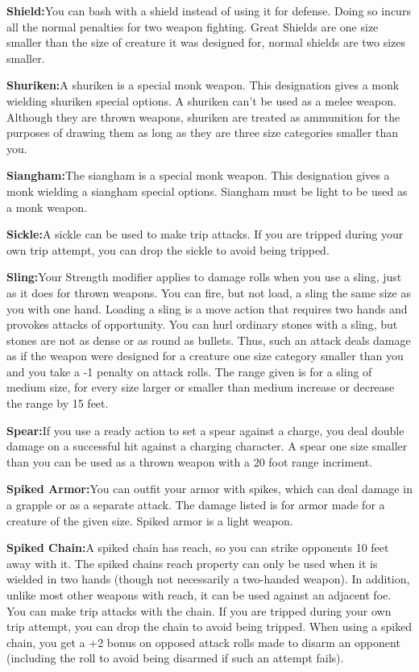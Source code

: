 \textbf{Shield:}{You can bash with a shield instead of using it for defense. Doing so incurs all the normal penalties for two weapon fighting. Great Shields are one size smaller than the size of creature it was designed for, normal shields are two sizes smaller.}

\textbf{Shuriken:}{A shuriken is a special monk weapon. This designation gives a monk wielding shuriken special options. A shuriken can't be used as a melee weapon. Although they are thrown weapons, shuriken are treated as ammunition for the purposes of drawing them as long as they are three size categories smaller than you.}

\textbf{Siangham:}{The siangham is a special monk weapon. This designation gives a monk wielding a siangham special options. Siangham must be light to be used as a monk weapon.}

\textbf{Sickle:}{A sickle can be used to make trip attacks. If you are tripped during your own trip attempt, you can drop the sickle to avoid being tripped.}

\textbf{Sling:}{Your Strength modifier applies to damage rolls when you use a sling, just as it does for thrown weapons. You can fire, but not load, a sling the same size as you with one hand. Loading a sling is a move action that requires two hands and provokes attacks of opportunity. You can hurl ordinary stones with a sling, but stones are not as dense or as round as bullets. Thus, such an attack deals damage as if the weapon were designed for a creature one size category smaller than you and you take a -1 penalty on attack rolls. The range given is for a sling of medium size, for every size larger or smaller than medium increase or decrease the range by 15 feet.}

\textbf{Spear:}{If you use a ready action to set a spear against a charge, you deal double damage on a successful hit against a charging character. A spear one size smaller than you can be used as a thrown weapon with a 20 foot range incriment.}

\textbf{Spiked Armor:}{You can outfit your armor with spikes, which can deal damage in a grapple or as a separate attack. The damage listed is for armor made for a creature of the given size. Spiked armor is a light weapon.}

\textbf{Spiked Chain:}{A spiked chain has reach, so you can strike opponents 10 feet away with it. The spiked chains reach property can only be used when it is wielded in two hands (though not necessarily a two-handed weapon). In addition, unlike most other weapons with reach, it can be used against an adjacent foe. You can make trip attacks with the chain. If you are tripped during your own trip attempt, you can drop the chain to avoid being tripped. When using a spiked chain, you get a +2 bonus on opposed attack rolls made to disarm an opponent (including the roll to avoid being disarmed if such an attempt fails).}

